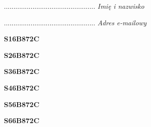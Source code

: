 \begin{turn}{90}\begin{minipage}{\linewidth} \vspace{20mm} ................................................  \textit{Imię i nazwisko}\end{minipage}\end{turn}

\begin{turn}{90}\begin{minipage}{\linewidth} \vspace{20mm} ................................................  \textit{Adres e-mailowy}\end{minipage}\end{turn}

\begin{turn}{90}\huge \begin{minipage}{\linewidth} \vspace{10mm}\textbf{S16B872C}\end{minipage}\end{turn}

\begin{turn}{90}\huge \begin{minipage}{\linewidth} \vspace{10mm}\textbf{S26B872C}\end{minipage}\end{turn}

\begin{turn}{90}\huge \begin{minipage}{\linewidth} \vspace{10mm}\textbf{S36B872C}\end{minipage}\end{turn}

\begin{turn}{90}\huge \begin{minipage}{\linewidth} \vspace{10mm}\textbf{S46B872C}\end{minipage}\end{turn}

\begin{turn}{90}\huge \begin{minipage}{\linewidth} \vspace{10mm}\textbf{S56B872C}\end{minipage}\end{turn}

\begin{turn}{90}\huge \begin{minipage}{\linewidth} \vspace{10mm}\textbf{S66B872C}\end{minipage}\end{turn}

